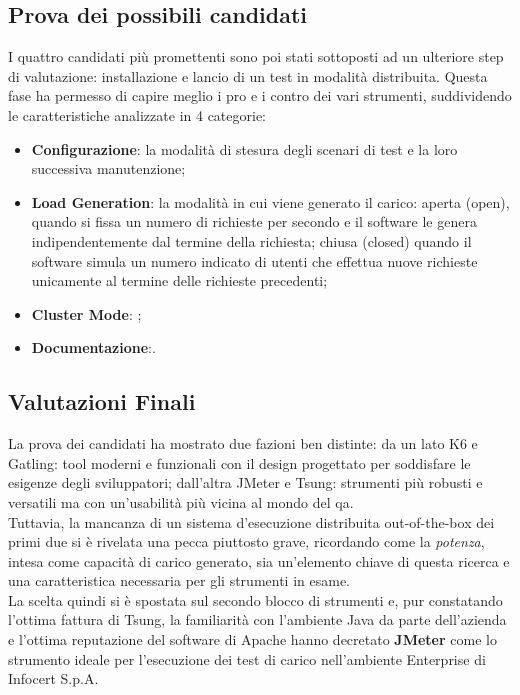 \subsection{Prova dei possibili candidati}
I quattro candidati più promettenti sono poi stati sottoposti ad un ulteriore step di valutazione: installazione e lancio di un test in modalità distribuita. Questa fase ha permesso di capire meglio i pro e i contro dei vari strumenti, suddividendo le caratteristiche analizzate in 4 categorie:
\begin{itemize}
	\item \textbf{Configurazione}: la modalità di stesura degli scenari di test e la loro successiva manutenzione;
	\item \textbf{Load Generation}: la modalità in cui viene generato il carico: aperta (open), quando si fissa un numero di richieste per secondo e il software le genera indipendentemente dal termine della richiesta; chiusa (closed) quando il software simula un numero indicato di utenti che effettua nuove richieste unicamente al termine delle richieste precedenti;
	\item \textbf{Cluster Mode}: ;
	\item \textbf{Documentazione}:.
\end{itemize}
\subsection{Valutazioni Finali}
La prova dei candidati ha mostrato due fazioni ben distinte: da un lato K6 e Gatling: tool moderni e funzionali con il design progettato per soddisfare le esigenze degli sviluppatori; dall'altra JMeter e Tsung: strumenti più robusti e versatili ma con un'usabilità più vicina al mondo del \gls{qa}. \\
Tuttavia, la mancanza di un sistema d'esecuzione distribuita \gls{out-of-the-box} dei primi due si è rivelata una pecca piuttosto grave, ricordando come la \textit{potenza}, intesa come capacità di carico generato, sia un'elemento chiave di questa ricerca e una caratteristica necessaria per gli strumenti in esame. \\
La scelta quindi si è spostata sul secondo blocco di strumenti e, pur constatando l'ottima fattura di Tsung, la familiarità con l'ambiente Java da parte dell'azienda e l'ottima reputazione del software di Apache hanno decretato \textbf{JMeter} come lo strumento ideale per l'esecuzione dei test di carico nell'ambiente Enterprise di Infocert S.p.A.